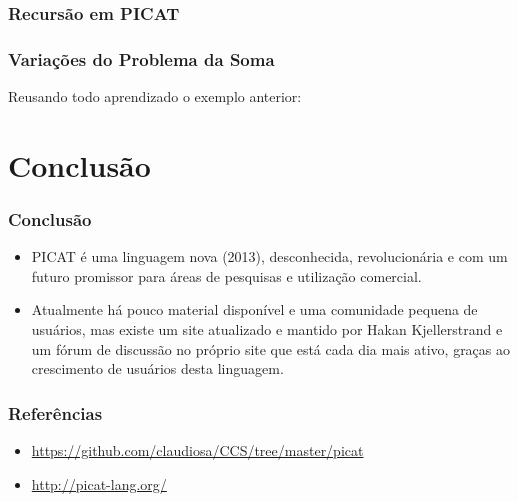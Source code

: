 \documentclass[10pt]{beamer}
\begin{document}

\begin{frame}[allowframebreaks=0.9]
\frametitle{Recursão em PICAT}



\end{frame}


\begin{frame}[allowframebreaks=0.9]
\frametitle{Variações do Problema da Soma}

Reusando todo aprendizado o exemplo anterior:



\end{frame}




\section{Conclusão}
\begin{frame}
    \frametitle{Conclusão}
    \begin{itemize}
    \item PICAT é uma linguagem nova (2013), desconhecida, revolucionária e com um futuro promissor para áreas de pesquisas e utilização comercial.
    \item Atualmente há pouco material disponível e uma comunidade pequena de usuários, 
    mas existe um site atualizado e mantido por Hakan Kjellerstrand e um fórum de discussão no próprio site que está cada dia mais ativo, 
    graças ao crescimento de usuários desta linguagem.
    \end{itemize}
\end{frame}


\begin{frame}
    \frametitle{Referências}
    \begin{itemize}
     \item \url{https://github.com/claudiosa/CCS/tree/master/picat}
     \item \url{http://picat-lang.org/}
    \end{itemize}
\end{frame}
\end{document}
